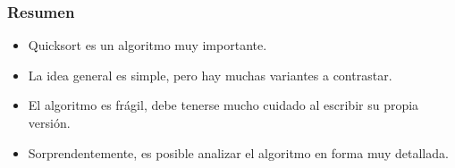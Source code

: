 \documentclass[english, spanish, fleqn,%
hyperref = {colorlinks, urlcolor = blue}%
]{beamer}
\begin{document}
\begin{frame}
  \setcounter{beamerpauses}{2}
  \frametitle{Resumen}

  \begin{itemize}
  \item
    \foreignlanguage{english}{Quicksort} es un algoritmo muy importante.
  \item
    La idea general es simple,
    pero hay muchas variantes a contrastar.
  \item
    El algoritmo es frágil,
    debe tenerse mucho cuidado al escribir su propia versión.
  \item
    Sorprendentemente,
    es posible analizar el algoritmo en forma muy detallada.
  \end{itemize}
\end{frame}
\end{document}
